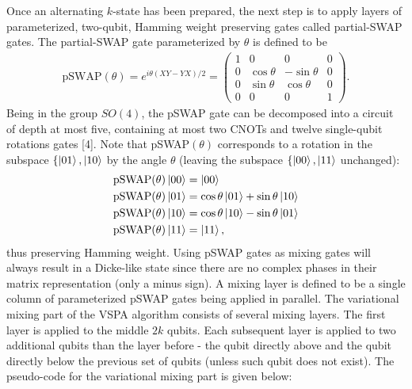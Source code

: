 \documentclass[Dual]{msu-thesis}
\begin{document}
Once an alternating $k$-state has been prepared, the next step is to apply layers of parameterized, two-qubit, Hamming weight preserving gates called partial-SWAP gates. The partial-SWAP gate parameterized by $\theta$ is defined to be
\begin{align}
\text{pSWAP}(\theta)
=
e^{i\theta(XY-YX)/2}
=
\begin{pmatrix}
1 & 0 & 0 & 0 \\
0 & \cos\theta & -\sin\theta & 0 \\
0 & \sin\theta & \cos\theta & 0 \\
0 & 0 & 0 & 1
\end{pmatrix}
.\end{align}
Being in the group $SO(4)$, the pSWAP gate can be decomposed into a circuit of depth at most five, containing at most two CNOTs and twelve single-qubit rotations gates [4]. Note that pSWAP$(\theta)$ corresponds to a rotation in the subspace $\{\ket{01},\ket{10}$ by the angle $\theta$ (leaving the subspace $\{\ket{00},\ket{11}$ unchanged):
\begin{align}
\text{pSWAP}(\theta)\ket{00} &= \ket{00}
\\
\text{pSWAP}(\theta)\ket{01} &= \cos\theta\ket{01} + \sin\theta\ket{10} 
\\
\text{pSWAP}(\theta)\ket{10} &= \cos\theta\ket{10} - \sin\theta\ket{01} 
\\
\text{pSWAP}(\theta)\ket{11} &= \ket{11}
,\end{align}
thus preserving Hamming weight. Using pSWAP gates as mixing gates will always result in a Dicke-like state since there are no complex phases in their matrix representation (only a minus sign). A mixing layer is defined to be a single column of parameterized pSWAP gates being applied in parallel. The variational mixing part of the VSPA algorithm consists of several mixing layers. The first layer is applied to the middle $2k$ qubits. Each subsequent layer is applied to two additional qubits than the layer before - the qubit directly above and the qubit directly below the previous set of qubits (unless such qubit does not exist). The pseudo-code for the variational mixing part is given below:
\end{document}
